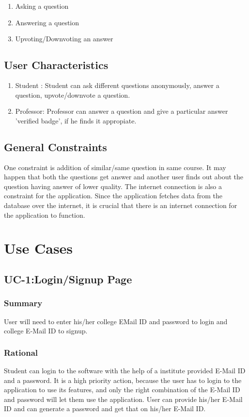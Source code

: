 \documentclass[journal,12pt,onecolumn,draftclsnofoot,]{IEEEtran}
\begin{document}
\begin{enumerate}
\item Asking a question
\item Answering a question
\item Upvoting/Downvoting an answer
\end{enumerate} 

\subsection{User Characteristics}
\begin{enumerate}
\item Student : Student can ask different questions anonymously, answer a question, upvote/downvote a question.
\item Professor: Professor can answer a question and  give a particular answer 'verified badge', if he finds it appropiate.
\end{enumerate} 

\subsection{General Constraints}
One constraint is addition of similar/same question in same course. It may happen that both the questions get answer and another user finds out about the question having answer of lower quality. The internet connection is also a constraint for the application. Since the application fetches data from the database over the internet, it is crucial that there is an internet connection for the application to function. 

\section{Use Cases}

\subsection{UC-1:Login/Signup Page}
\subsubsection{Summary}
User will need to enter his/her college EMail ID and password to login and college E-Mail ID to signup.
\subsubsection{Rational}
Student can login to the software with the help of a institute provided E-Mail ID and a password. It is a high priority action, because the user has to login to the application to use its features, and only the right combination
of the E-Mail ID and password will let them use the application. User can provide his/her E-Mail ID and can generate a password and get that on his/her E-Mail ID.
\end{document}
